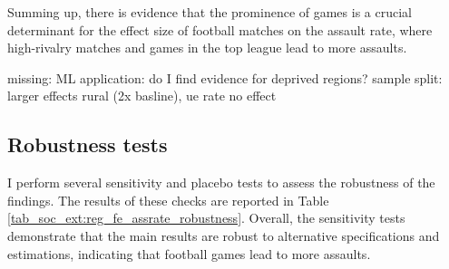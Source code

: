 Summing up, there is evidence that the prominence of games is a crucial determinant for the effect size of football matches on the assault rate, where high-rivalry matches and games in the top league lead to more assaults.


{\color{red} missing: ML application: do I find evidence for deprived regions?}\newline
sample split: larger effects rural (2x basline), ue rate no effect 










\subsection{Robustness tests}
I perform several sensitivity and placebo tests to assess the robustness of the findings. The results of these checks are reported in Table \ref{tab_soc_ext:reg_fe_assrate_robustness}. Overall, the sensitivity tests demonstrate that the main results are robust to alternative specifications and estimations, indicating that football games lead to more assaults.\newline





